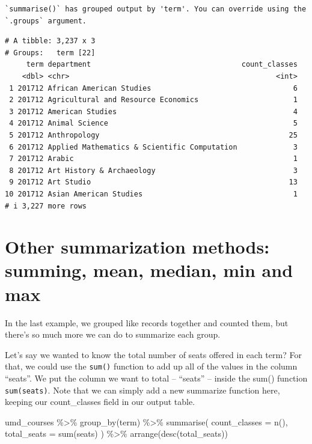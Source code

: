 \documentclass[
  letterpaper,
  DIV=11,
  numbers=noendperiod]{scrreprt}
\newenvironment{Shaded}{\begin{snugshade}}{\end{snugshade}}
\newcommand{\AttributeTok}[1]{\textcolor[rgb]{0.40,0.45,0.13}{#1}}
\newcommand{\FunctionTok}[1]{\textcolor[rgb]{0.28,0.35,0.67}{#1}}
\newcommand{\NormalTok}[1]{\textcolor[rgb]{0.00,0.23,0.31}{#1}}
\newcommand{\SpecialCharTok}[1]{\textcolor[rgb]{0.37,0.37,0.37}{#1}}
\begin{document}
\begin{verbatim}
`summarise()` has grouped output by 'term'. You can override using the
`.groups` argument.
\end{verbatim}

\begin{verbatim}
# A tibble: 3,237 x 3
# Groups:   term [22]
     term department                                   count_classes
    <dbl> <chr>                                                <int>
 1 201712 African American Studies                                 6
 2 201712 Agricultural and Resource Economics                      1
 3 201712 American Studies                                         4
 4 201712 Animal Science                                           5
 5 201712 Anthropology                                            25
 6 201712 Applied Mathematics & Scientific Computation             3
 7 201712 Arabic                                                   1
 8 201712 Art History & Archaeology                                3
 9 201712 Art Studio                                              13
10 201712 Asian American Studies                                   1
# i 3,227 more rows
\end{verbatim}

\hypertarget{other-summarization-methods-summing-mean-median-min-and-max}{%
\section{Other summarization methods: summing, mean, median, min and
max}\label{other-summarization-methods-summing-mean-median-min-and-max}}

In the last example, we grouped like records together and counted them,
but there's so much more we can do to summarize each group.

Let's say we wanted to know the total number of seats offered in each
term? For that, we could use the \texttt{sum()} function to add up all
of the values in the column ``seats''. We put the column we want to
total -- ``seats'' -- inside the sum() function \texttt{sum(seats)}.
Note that we can simply add a new summarize function here, keeping our
count\_classes field in our output table.

\begin{Shaded}
\begin{Highlighting}[]
\NormalTok{umd\_courses }\SpecialCharTok{\%\textgreater{}\%}
  \FunctionTok{group\_by}\NormalTok{(term) }\SpecialCharTok{\%\textgreater{}\%}
  \FunctionTok{summarise}\NormalTok{(}
    \AttributeTok{count\_classes =} \FunctionTok{n}\NormalTok{(),}
    \AttributeTok{total\_seats =} \FunctionTok{sum}\NormalTok{(seats)}
\NormalTok{  ) }\SpecialCharTok{\%\textgreater{}\%}
  \FunctionTok{arrange}\NormalTok{(}\FunctionTok{desc}\NormalTok{(total\_seats))}
\end{Highlighting}
\end{Shaded}
\end{document}
